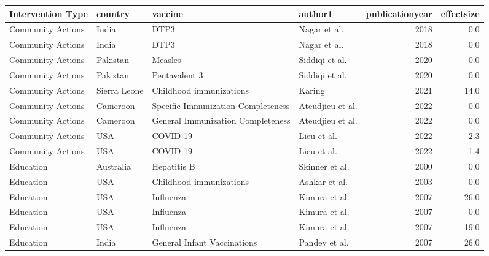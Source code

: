 
\begin{tabular}{llllrr}
\toprule
Intervention Type & country & vaccine & author1 & publicationyear & effectsize\\
\midrule
Community Actions & India & DTP3 & Nagar et al. & 2018 & 0.0\\
Community Actions & India & DTP3 & Nagar et al. & 2018 & 0.0\\
Community Actions & Pakistan & Measles & Siddiqi et al. & 2020 & 0.0\\
Community Actions & Pakistan & Pentavalent 3 & Siddiqi et al. & 2020 & 0.0\\
Community Actions & Sierra Leone & Childhood immunizations & Karing & 2021 & 14.0\\
\addlinespace
Community Actions & Cameroon & Specific Immunization Completeness & Ateudjieu et al. & 2022 & 0.0\\
Community Actions & Cameroon & General Immunization Completeness & Ateudjieu et al. & 2022 & 0.0\\
Community Actions & USA & COVID-19 & Lieu et al. & 2022 & 2.3\\
Community Actions & USA & COVID-19 & Lieu et al. & 2022 & 1.4\\
Education & Australia & Hepatitis B & Skinner et al. & 2000 & 0.0\\
\addlinespace
Education & USA & Childhood immunizations & Ashkar et al. & 2003 & 0.0\\
Education & USA & Influenza & Kimura et al. & 2007 & 26.0\\
Education & USA & Influenza & Kimura et al. & 2007 & 0.0\\
Education & USA & Influenza & Kimura et al. & 2007 & 19.0\\
Education & India & General Infant Vaccinations & Pandey et al. & 2007 & 26.0\\
\bottomrule
\end{tabular}
